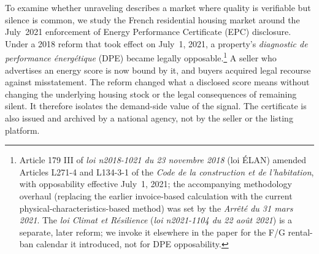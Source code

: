 To examine whether unraveling describes a market where quality is verifiable but silence is
common, we study the French residential housing market around the July~2021 enforcement of
Energy Performance Certificate (EPC) disclosure. Under a 2018 reform that took effect on
July~1, 2021, a property's \emph{diagnostic de performance \'energ\'etique} (DPE) became
legally opposable.\footnote{Article 179 III of \emph{loi n\textdegree{}2018-1021 du 23 novembre
2018} (loi \'ELAN) amended Articles L271-4 and L134-3-1 of the \emph{Code de la construction et
de l'habitation}, with opposability effective July~1, 2021; the accompanying methodology
overhaul (replacing the earlier invoice-based calculation with the current
physical-characteristics-based method) was set by the \emph{Arr\^et\'e du 31 mars 2021}. The
\emph{loi Climat et R\'esilience} (\emph{loi n\textdegree{}2021-1104 du 22 ao\^ut 2021}) is a
separate, later reform; we invoke it elsewhere in the paper for the F/G rental-ban calendar it
introduced, not for DPE opposability.} A seller who advertises an energy score is now bound by
it, and buyers acquired legal recourse against misstatement. The reform changed what a disclosed
score means without changing the underlying housing stock or the legal consequences of remaining
silent. It therefore isolates the demand-side value of the signal. The certificate is also issued
and archived by a national agency, not by the seller or the listing platform.
